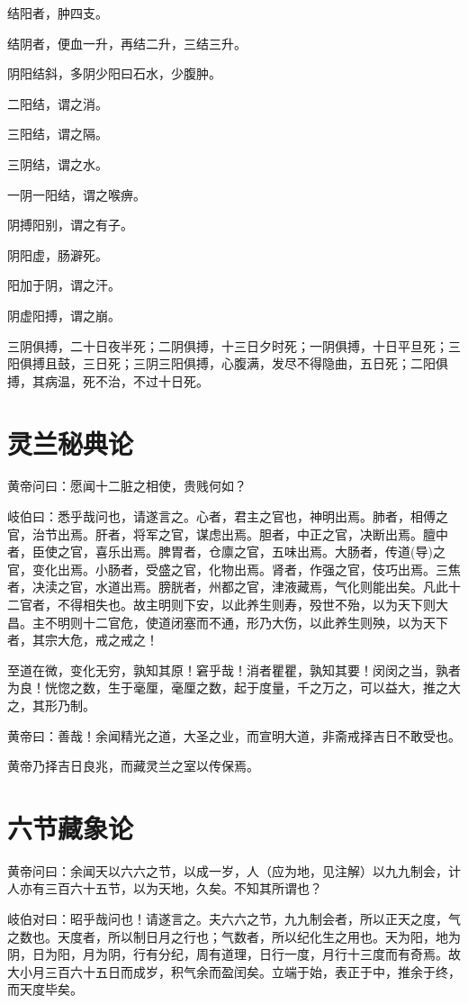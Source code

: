 \documentclass{article}%
\begin{document}
结阳者，肿四支。

结阴者，便血一升，再结二升，三结三升。

阴阳结斜，多阴少阳曰石水，少腹肿。

二阳结，谓之消。

三阳结，谓之隔。

三阴结，谓之水。

一阴一阳结，谓之喉痹。

阴搏阳别，谓之有子。

阴阳虚，肠澼死。

阳加于阴，谓之汗。

阴虚阳搏，谓之崩。

三阴俱搏，二十日夜半死；二阴俱搏，十三日夕时死；一阴俱搏，十日平旦死；三阳俱搏且鼓，三日死；三阴三阳俱搏，心腹满，发尽不得隐曲，五日死；二阳俱搏，其病温，死不治，不过十日死。
\section{灵兰秘典论}
黄帝问曰：愿闻十二脏之相使，贵贱何如？

岐伯曰：悉乎哉问也，请遂言之。心者，君主之官也，神明出焉。肺者，相傅之官，治节出焉。肝者，将军之官，谋虑出焉。胆者，中正之官，决断出焉。膻中者，臣使之官，喜乐出焉。脾胃者，仓廪之官，五味出焉。大肠者，传道(导)之官，变化出焉。小肠者，受盛之官，化物出焉。肾者，作强之官，伎巧出焉。三焦者，决渎之官，水道出焉。膀胱者，州都之官，津液藏焉，气化则能出矣。凡此十二官者，不得相失也。故主明则下安，以此养生则寿，殁世不殆，以为天下则大昌。主不明则十二官危，使道闭塞而不通，形乃大伤，以此养生则殃，以为天下者，其宗大危，戒之戒之！

至道在微，变化无穷，孰知其原！窘乎哉！消者瞿瞿，孰知其要！闵闵之当，孰者为良！恍惚之数，生于毫厘，毫厘之数，起于度量，千之万之，可以益大，推之大之，其形乃制。

黄帝曰：善哉！余闻精光之道，大圣之业，而宣明大道，非斋戒择吉日不敢受也。

黄帝乃择吉日良兆，而藏灵兰之室以传保焉。
\section{六节藏象论}
黄帝问曰：余闻天以六六之节，以成一岁，人（应为地，见注解）以九九制会，计人亦有三百六十五节，以为天地，久矣。不知其所谓也？

岐伯对曰：昭乎哉问也！请遂言之。夫六六之节，九九制会者，所以正天之度，气之数也。天度者，所以制日月之行也；气数者，所以纪化生之用也。天为阳，地为阴，日为阳，月为阴，行有分纪，周有道理，日行一度，月行十三度而有奇焉。故大小月三百六十五日而成岁，积气余而盈闰矣。立端于始，表正于中，推余于终，而天度毕矣。
\end{document}
